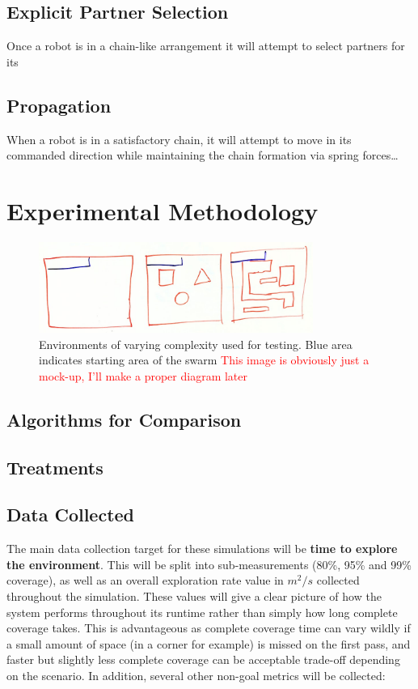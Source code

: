 \documentclass[runningheads]{llncs}
\newcommand\incomplete[1]{\textcolor{red}{#1}}
\begin{document}
\subsection{Explicit Partner Selection}
Once a robot is in a chain-like arrangement it will attempt to select partners for its 

\subsection{Propagation}
When a robot is in a satisfactory chain, it will attempt to move in its commanded direction while maintaining the chain formation via spring forces\dots


\pagebreak
\section{Experimental Methodology}
\begin{figure}[h]
    \centering
    \includegraphics[width=0.8\textwidth]{Images/Example Environments.jpg}
    \caption{Environments of varying complexity used for testing. Blue area indicates starting area of the swarm \incomplete{This image is obviously just a mock-up, I'll make a proper diagram later}}
    \label{fig:example environments}
    \end{figure}

\subsection{Algorithms for Comparison}



\subsection{Treatments}

\subsection{Data Collected}
The main data collection target for these simulations will be \textbf{time to explore the environment}. This will be split into sub-measurements (80\%, 95\% and 99\% coverage), as well as an overall exploration rate value in $m^2/s$ collected throughout the simulation. These values will give a clear picture of how the system performs throughout its runtime rather than simply how long complete coverage takes. This is advantageous as complete coverage time can vary wildly if a small amount of space (in a corner for example) is missed on the first pass, and faster but slightly less complete coverage can be acceptable trade-off depending on the scenario. In addition, several other non-goal metrics will be collected:
\end{document}
